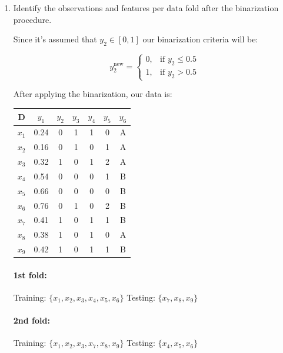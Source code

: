 \documentclass[12pt]{article}
\begin{document}
\begin{enumerate}[leftmargin=\labelsep]
    \begin{enumerate}
        \item Identify the observations and features per data fold after the binarization procedure.
        
        Since it's assumed that $y_2 \in [0, 1]$ our binarization criteria will be:

        \[ 
            y_2^{\textrm{new}} = \left\{
            \begin{array}{ll}
                  0, & \textrm{if } y_2 \leq 0.5 \\
                  1, & \textrm{if } y_2 > 0.5
            \end{array} 
            \right. 
        \]

        After applying the binarization, our data is:

        \begin{center}
        \begin{tabular}{|c|c|c|c|c|c|c|}
        \hline
        D     & $y_1$ & $y_2$ & $y_3$ & $y_4$ & $y_5$ & $y_6$ \\
        \hline
        $x_1$ & 0.24  & 0     & 1     & 1     & 0     & A \\
        $x_2$ & 0.16  & 0     & 1     & 0     & 1     & A \\
        $x_3$ & 0.32  & 1     & 0     & 1     & 2     & A \\
        $x_4$ & 0.54  & 0     & 0     & 0     & 1     & B \\
        $x_5$ & 0.66  & 0     & 0     & 0     & 0     & B \\
        $x_6$ & 0.76  & 0     & 1     & 0     & 2     & B \\
        $x_7$ & 0.41  & 1     & 0     & 1     & 1     & B \\
        $x_8$ & 0.38  & 1     & 0     & 1     & 0     & A \\
        $x_9$ & 0.42  & 1     & 0     & 1     & 1     & B \\
        \hline
        \end{tabular}
        \end{center}

        \paragraph{1st fold:} Training: $\{x_1, x_2, x_3, x_4, x_5, x_6\}$ Testing: $\{x_7, x_8, x_9\}$
        \paragraph{2nd fold:} Training: $\{x_1, x_2, x_3, x_7, x_8, x_9\}$ Testing: $\{x_4, x_5, x_6\}$

\end{enumerate}
\end{enumerate}
\end{document}
